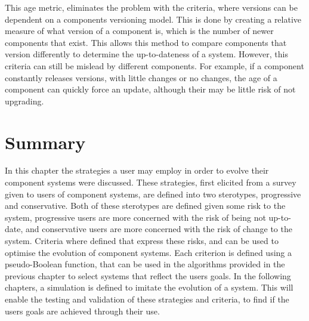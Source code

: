 This age metric, eliminates the problem with the criteria, where versions can be dependent on a components versioning model.
This is done by creating a relative measure of what version of a component is, which is the number of newer components that exist.
This allows this method to compare components that version differently to determine the up-to-dateness of a system.
However, this criteria can still be mislead by different components.
For example, if a component constantly releases versions, with little changes or no changes, the age of a component can quickly force an update, 
although their may be little risk of not upgrading. 


\section{Summary}
In this chapter the strategies a user may employ in order to evolve their component systems were discussed.
These strategies, first elicited from a survey given to users of component systems, are defined into two sterotypes, progressive and conservative.
Both of these sterotypes are defined given some risk to the system, progressive users are more concerned with the risk of being not up-to-date,
and conservative users are more concerned with the risk of change to the system.
Criteria where defined that express these risks, and can be used to optimise the evolution of component systems.
Each criterion is defined using a pseudo-Boolean function, that can be used in the algorithms provided in the previous chapter to select systems that reflect the users goals.
In the following chapters, a simulation is defined to imitate the evolution of a system.
This will enable the testing and validation of these strategies and criteria, to find if the users goals are achieved through their use. 

